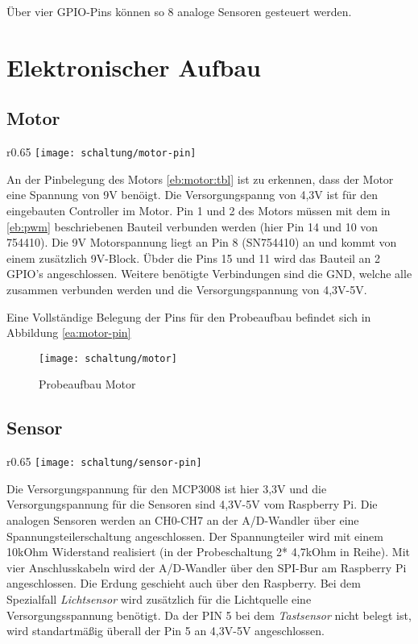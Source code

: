 Über vier GPIO-Pins können so 8 analoge Sensoren gesteuert werden.

\section{Elektronischer Aufbau}

\subsection{Motor}
\begin{wrapfigure}{r}{0.65\textwidth}
\texttt{[image: schaltung/motor-pin]}
\caption{GPIO Belegung Motor}
\label{ea:motor-pin}
\end{wrapfigure}
An der Pinbelegung des Motors \ref{eb:motor:tbl} ist zu erkennen, dass der Motor eine Spannung von 9V benöigt. Die Versorgungspanng von 4,3V ist für den eingebauten Controller im Motor. Pin 1 und 2 des Motors müssen mit dem in \ref{eb:pwm} beschriebenen Bauteil verbunden werden (hier Pin 14 und 10 von 754410). Die 9V Motorspannung liegt an Pin 8 (SN754410) an und kommt von einem zusätzlich 9V-Block. Übder die Pins 15 und 11 wird das Bauteil an 2 GPIO's angeschlossen. Weitere benötigte Verbindungen sind die GND, welche alle zusammen verbunden werden und die Versorgungspannung von 4,3V-5V.

Eine Vollständige Belegung der Pins für den Probeaufbau befindet sich in Abbildung \ref{ea:motor-pin}

\begin{figure}[h]
  \centering
  \texttt{[image: schaltung/motor]}
  \caption{Probeaufbau Motor}
  \label{schaltung:motor}
\end{figure}

\subsection{Sensor}
\begin{wrapfigure}{r}{0.65\textwidth}
\texttt{[image: schaltung/sensor-pin]}
\caption{GPIO Belegung Sensor}
\label{ea:sensor-pin}
\end{wrapfigure}

Die Versorgungspannung für den MCP3008 ist hier 3,3V und die Versorgungspannung für die Sensoren sind 4,3V-5V vom Raspberry Pi. Die analogen Sensoren werden an CH0-CH7 an der A/D-Wandler über eine Spannungsteilerschaltung angeschlossen. Der Spannungteiler wird mit einem 10kOhm Widerstand realisiert (in der Probeschaltung 2* 4,7kOhm in Reihe). Mit vier Anschlusskabeln wird der A/D-Wandler über den SPI-Bur am Raspberry Pi angeschlossen. Die Erdung geschieht auch über den Raspberry. Bei dem Spezialfall \emph{Lichtsensor} wird zusätzlich für die Lichtquelle eine Versorgungsspannung benötigt. Da der PIN 5 bei dem \emph{Tastsensor} nicht belegt ist, wird standartmäßig überall der Pin 5 an 4,3V-5V angeschlossen.


